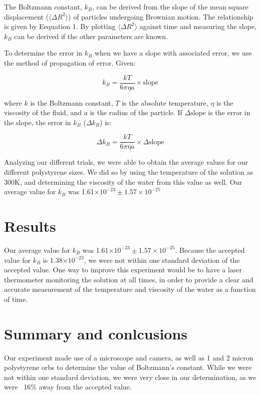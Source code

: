 \documentclass[10pt,letterpaper,onecolumn]{article}
\begin{document}
The Boltzmann constant, \( k_B \), can be derived from the slope of the mean square displacement (\( \langle \Delta R^2 \rangle \)) of particles undergoing Brownian motion. The relationship is given by
Eequation 1.
By plotting \( \langle \Delta R^2 \rangle \) against time and measuring the slope, \( k_B \) can be derived if the other parameters are known.



To determine the error in \( k_B \) when we have a slope with associated error, we use the method of propagation of error. Given:

\[ k_B = \frac{kT}{6\pi \eta a} \times \text{slope} \]

where \( k \) is the Boltzmann constant, \( T \) is the absolute temperature, \( \eta \) is the viscosity of the fluid, and \( a \) is the radius of the particle. If \(\Delta \text{slope}\) is the error in the slope, the error in \( k_B \) (\( \Delta k_B \)) is:

\[ \Delta k_B = \frac{kT}{6\pi \eta a} \times \Delta \text{slope} \]

Analyzing our different trials, we were able to obtain the average values for our different polystyrene sizes. We did so by using the temperature of the solution as 300K, and determining the viscosity of the water from this value as well.
Our average value for $k_B$ was 1.61$\times10^{-23} \pm 1.57\times10^{-25}$


\section{Results}
Our average value for $k_B$ was 1.61$\times10^{-23} \pm 1.57\times10^{-25}$. Because the accepted value for $k_B$ is 1.38$\times10^{-23}$, we were not
within one standard deviation of the accepted value. One way to improve this experiment would be to have a laser thermometer monitoring the solution at all times, 
in order to provide a clear and accurate measurement of the temperature and viscosity of the water as a function of time.

\section{Summary and conlcusions}

Our experiment made use of a microscope and camera, as well as 1 and 2 micron polystyrene orbs to determine the value of Boltzmann's constant. While we were not within one 
standard deviation, we were very close in our determination, as we were ~16\% away from the accepted value.
\end{document}
